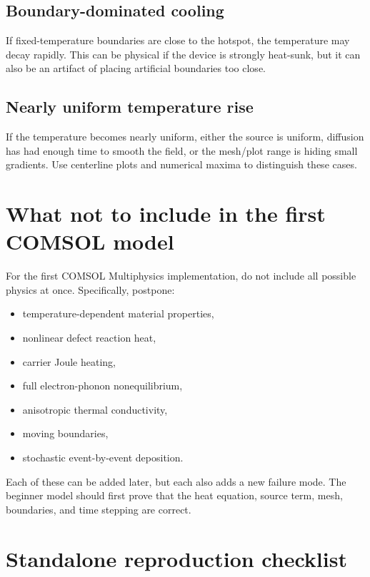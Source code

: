 \documentclass[11pt]{article}
\newcommand{\COMSOL}{COMSOL Multiphysics}
\newcommand{\comsol}{\COMSOL}
\begin{document}
\subsection{Boundary-dominated cooling}
If fixed-temperature boundaries are close to the hotspot, the temperature may decay rapidly.  This can be physical if the device is strongly heat-sunk, but it can also be an artifact of placing artificial boundaries too close.

\subsection{Nearly uniform temperature rise}
If the temperature becomes nearly uniform, either the source is uniform, diffusion has had enough time to smooth the field, or the mesh/plot range is hiding small gradients.  Use centerline plots and numerical maxima to distinguish these cases.

\section{What not to include in the first COMSOL model}

For the first \comsol{} implementation, do not include all possible physics at once.  Specifically, postpone:
\begin{itemize}
\item temperature-dependent material properties,
\item nonlinear defect reaction heat,
\item carrier Joule heating,
\item full electron-phonon nonequilibrium,
\item anisotropic thermal conductivity,
\item moving boundaries,
\item stochastic event-by-event deposition.
\end{itemize}

Each of these can be added later, but each also adds a new failure mode.  The beginner model should first prove that the heat equation, source term, mesh, boundaries, and time stepping are correct.

\section{Standalone reproduction checklist}
\end{document}
